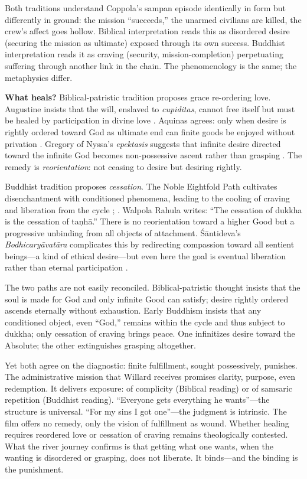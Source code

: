 Both traditions understand Coppola's sampan episode identically in form but differently in
ground: the mission ``succeeds,'' the unarmed civilians are killed, the crew's affect goes
hollow. Biblical interpretation reads this as disordered desire (securing the mission as
ultimate) exposed through its own success. Buddhist interpretation reads it as craving
(security, mission-completion) perpetuating suffering through another link in the chain. The
phenomenology is the same; the metaphysics differ.

\textbf{What heals?} Biblical-patristic tradition proposes grace re-ordering love. Augustine
insists that the will, enslaved to \emph{cupiditas}, cannot free itself but must be healed by
participation in divine love \parencite{AugustineCity2003}. Aquinas agrees: only when desire
is rightly ordered toward God as ultimate end can finite goods be enjoyed without privation
\parencite{AquinasST1947}. Gregory of Nyssa's \emph{epektasis} suggests that infinite desire
directed toward the infinite God becomes non-possessive ascent rather than grasping
\parencite{GregoryMoses1978}. The remedy is \emph{reorientation}: not ceasing to desire but
desiring rightly.

Buddhist tradition proposes \emph{cessation}. The Noble Eightfold Path cultivates
disenchantment with conditioned phenomena, leading to the cooling of craving and liberation
from the cycle \parencite{Rahula1959}; \parencite{Gethin1998}. Walpola Rahula writes: ``The
cessation of dukkha is the cessation of taṇhā.'' There is no reorientation toward a higher
Good but a progressive unbinding from all objects of attachment. Śāntideva's
\emph{Bodhicaryāvatāra} complicates this by redirecting compassion toward all sentient
beings---a kind of ethical desire---but even here the goal is eventual liberation rather than
eternal participation \parencite{SantidevaBCA1995}.

The two paths are not easily reconciled. Biblical-patristic thought insists that the soul is
made for God and only infinite Good can satisfy; desire rightly ordered ascends eternally
without exhaustion. Early Buddhism insists that any conditioned object, even ``God,'' remains
within the cycle and thus subject to dukkha; only cessation of craving brings peace. One
infinitizes desire toward the Absolute; the other extinguishes grasping altogether.

Yet both agree on the diagnostic: finite fulfillment, sought possessively, punishes. The
administrative mission that Willard receives promises clarity, purpose, even redemption. It
delivers exposure: of complicity (Biblical reading) or of samsaric repetition (Buddhist
reading). ``Everyone gets everything he wants''---the structure is universal. ``For my sins I
got one''---the judgment is intrinsic. The film offers no remedy, only the vision of
fulfillment as wound. Whether healing requires reordered love or cessation of craving remains
theologically contested. What the river journey confirms is that getting what one wants, when
the wanting is disordered or grasping, does not liberate. It binds---and the binding is the
punishment.
